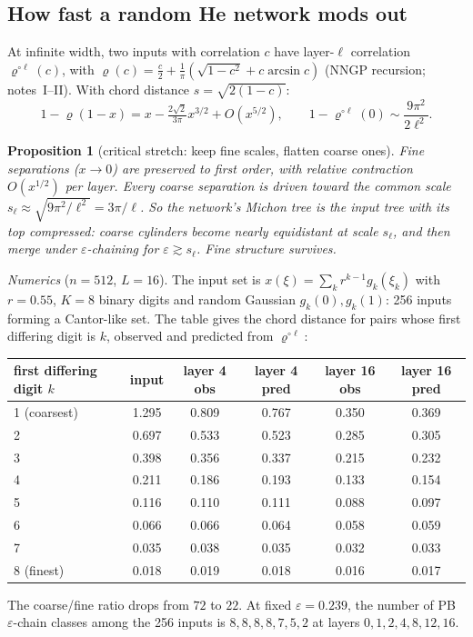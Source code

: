 \documentclass[11pt]{article}
\newtheorem{proposition}[theorem]{Proposition}
\theoremstyle{definition}
\theoremstyle{remark}
\begin{document}
\subsection{How fast a random He network mods out}
At infinite width, two inputs with correlation $c$ have layer-$\ell$ correlation $\varrho^{\circ\ell}(c)$, with $\varrho(c)=\frac c2+\frac1\pi(\sqrt{1-c^2}+c\arcsin c)$ (NNGP recursion; notes~I--II). With chord distance $s=\sqrt{2(1-c)}$:
\[1-\varrho(1-x)=x-\tfrac{2\sqrt2}{3\pi}x^{3/2}+O(x^{5/2}),\qquad 1-\varrho^{\circ\ell}(0)\sim\frac{9\pi^2}{2\ell^2}.\]

\begin{proposition}[critical stretch: keep fine scales, flatten coarse ones]\label{prop:flatten}
Fine separations ($x\to0$) are preserved to first order, with relative contraction $O(x^{1/2})$ per layer. Every coarse separation is driven toward the common scale $s_\ell\approx\sqrt{9\pi^2/\ell^2}=3\pi/\ell$. So the network's Michon tree is the input tree with its top compressed: coarse cylinders become nearly equidistant at scale $s_\ell$, and then merge under $\varepsilon$-chaining for $\varepsilon\gtrsim s_\ell$. Fine structure survives.
\end{proposition}

\noindent\emph{Numerics} ($n=512$, $L=16$). The input set is $x(\xi)=\sum_kr^{k-1}g_k(\xi_k)$ with $r=0.55$, $K=8$ binary digits and random Gaussian $g_k(0),g_k(1)$: 256 inputs forming a Cantor-like set. The table gives the chord distance for pairs whose first differing digit is $k$, observed and predicted from $\varrho^{\circ\ell}$:
\begin{center}\small
\setlength{\tabcolsep}{3pt}
\begin{tabular}{lccccc}
\toprule
first differing digit $k$ & input & layer 4 obs & layer 4 pred & layer 16 obs & layer 16 pred\\
\midrule
1 (coarsest) & 1.295 & 0.809 & 0.767 & 0.350 & 0.369\\
2 & 0.697 & 0.533 & 0.523 & 0.285 & 0.305\\
3 & 0.398 & 0.356 & 0.337 & 0.215 & 0.232\\
4 & 0.211 & 0.186 & 0.193 & 0.133 & 0.154\\
5 & 0.116 & 0.110 & 0.111 & 0.088 & 0.097\\
6 & 0.066 & 0.066 & 0.064 & 0.058 & 0.059\\
7 & 0.035 & 0.038 & 0.035 & 0.032 & 0.033\\
8 (finest) & 0.018 & 0.019 & 0.018 & 0.016 & 0.017\\
\bottomrule
\end{tabular}
\end{center}
The coarse/fine ratio drops from $72$ to $22$. At fixed $\varepsilon=0.239$, the number of PB $\varepsilon$-chain classes among the 256 inputs is $8,8,8,8,7,5,2$ at layers $0,1,2,4,8,12,16$.
\end{document}
